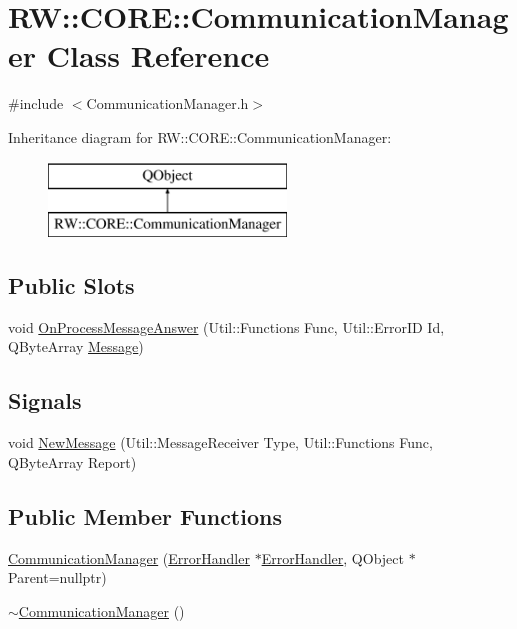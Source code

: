 \hypertarget{class_r_w_1_1_c_o_r_e_1_1_communication_manager}{}\section{RW\+:\+:C\+O\+RE\+:\+:Communication\+Manager Class Reference}
\label{class_r_w_1_1_c_o_r_e_1_1_communication_manager}


{\ttfamily \#include $<$Communication\+Manager.\+h$>$}

Inheritance diagram for RW\+:\+:C\+O\+RE\+:\+:Communication\+Manager\+:\begin{figure}[H]
\begin{center}
\leavevmode
\includegraphics[height=2.000000cm]{class_r_w_1_1_c_o_r_e_1_1_communication_manager}
\end{center}
\end{figure}
\subsection*{Public Slots}
\begin{DoxyCompactItemize}
\item 
void \hyperlink{class_r_w_1_1_c_o_r_e_1_1_communication_manager_a7c890fda317487cb2892d728e0b7e131}{On\+Process\+Message\+Answer} (Util\+::\+Functions Func, Util\+::\+Error\+ID Id, Q\+Byte\+Array \hyperlink{namespace_r_w_1_1_c_o_r_e_a571834b44d0e3fab58aa6abfe5a02988}{Message})
\end{DoxyCompactItemize}
\subsection*{Signals}
\begin{DoxyCompactItemize}
\item 
void \hyperlink{class_r_w_1_1_c_o_r_e_1_1_communication_manager_aae001b1bddaf9c74f20795f6954432b9}{New\+Message} (Util\+::\+Message\+Receiver Type, Util\+::\+Functions Func, Q\+Byte\+Array Report)
\end{DoxyCompactItemize}
\subsection*{Public Member Functions}
\begin{DoxyCompactItemize}
\item 
\hyperlink{class_r_w_1_1_c_o_r_e_1_1_communication_manager_a8afb1aacf5b5d582256afdda0d191d91}{Communication\+Manager} (\hyperlink{class_r_w_1_1_c_o_r_e_1_1_error_handler}{Error\+Handler} $\ast$\hyperlink{class_r_w_1_1_c_o_r_e_1_1_error_handler}{Error\+Handler}, Q\+Object $\ast$Parent=nullptr)
\item 
\hyperlink{class_r_w_1_1_c_o_r_e_1_1_communication_manager_a4fc7eed7b4e58d01100820e21eb19f57}{$\sim$\+Communication\+Manager} ()
\end{DoxyCompactItemize}

